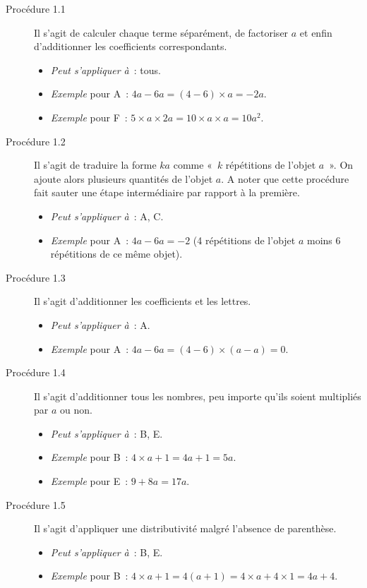 \documentclass{report}
\theoremstyle{definition}
\begin{document}
\begin{description}

\item[\textcolor{bpc}{Procédure 1.1}] Il s'agit de calculer chaque terme séparément, de factoriser $a$ et enfin d'additionner les coefficients correspondants.
\begin{itemize}
\item \textit{Peut s'appliquer à}~: tous.
\item \textit{Exemple} pour A~: $4a-6a=(4-6)\times a=-2a$.
\item \textit{Exemple} pour F~: $5\times a\times 2a = 10\times a\times a = 10a^2$.
\end{itemize}

\item[\textcolor{bpc}{Procédure 1.2}] Il s'agit de traduire la forme $ka$ comme «~$k$ répétitions de l'objet $a$~». On ajoute alors plusieurs quantités de l'objet $a$. A noter que cette procédure fait sauter une étape intermédiaire par rapport à la première.
\begin{itemize}
\item \textit{Peut s'appliquer à}~: A, C.
\item \textit{Exemple} pour A~: $4a-6a=-2$ (4 répétitions de l'objet $a$ moins 6 répétitions de ce même objet).
\end{itemize}

\item[\textcolor{mpc}{Procédure 1.3}] Il s'agit d'additionner les coefficients et les lettres. 
\begin{itemize}
\item \textit{Peut s'appliquer à}~: A. 
\item \textit{Exemple} pour A~: $4a-6a=(4-6)\times(a-a)=0$.
\end{itemize}

\item[\textcolor{mpc}{Procédure 1.4}] Il s'agit d'additionner tous les nombres, peu importe qu'ils soient multipliés par $a$ ou non.
\begin{itemize}
\item \textit{Peut s'appliquer à}~:  B, E.
\item \textit{Exemple} pour B~: $4\times a+1=4a+1=5a$.
\item \textit{Exemple} pour E~: $9+8a=17a$.
\end{itemize}

\item[\textcolor{mpc}{Procédure 1.5}] Il s'agit d'appliquer une distributivité malgré l'absence de parenthèse.
\begin{itemize}
\item \textit{Peut s'appliquer à}~:  B, E.
\item \textit{Exemple} pour B~: $4\times a+1=4(a+1)=4\times a + 4\times 1 = 4a+4$.
\end{itemize}


\end{description}
\end{document}
